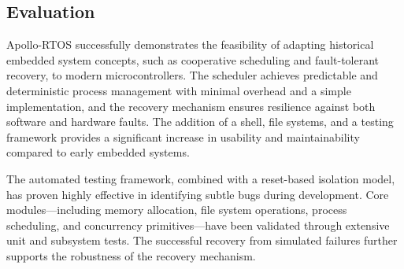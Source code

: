 \subsection{Evaluation}
\label{sec:evaluation}

Apollo-RTOS successfully demonstrates the feasibility of adapting historical embedded
system concepts, such as cooperative scheduling and fault-tolerant recovery, to modern
microcontrollers. The scheduler achieves predictable and deterministic process
management with minimal overhead and a simple implementation, and the recovery
mechanism ensures resilience against both software and hardware faults. The addition of
a shell, file systems, and a testing framework provides a significant increase in
usability and maintainability compared to early embedded systems.

The automated testing framework, combined with a reset-based isolation model, has
proven highly effective in identifying subtle bugs during development. Core
modules—including memory allocation, file system operations, process scheduling, and
concurrency primitives—have been validated through extensive unit and subsystem tests.
The successful recovery from simulated failures further supports the robustness of the
recovery mechanism.

